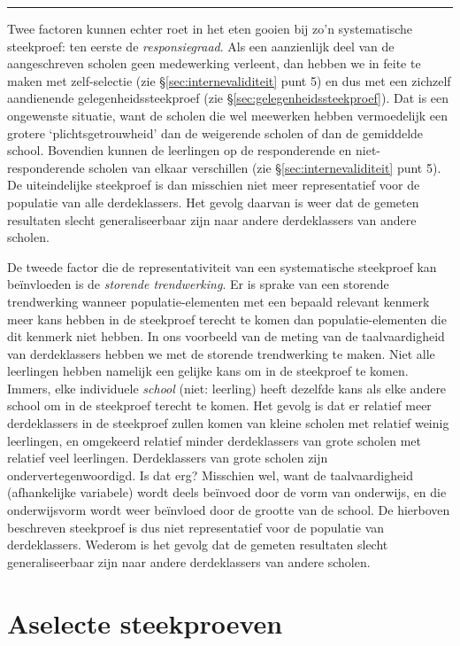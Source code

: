 \documentclass[
]{book}
\begin{document}
\begin{center}\rule{0.5\linewidth}{0.5pt}\end{center}

Twee factoren kunnen echter roet in het eten gooien bij zo'n
systematische steekproef: ten eerste de \emph{responsiegraad}. Als een
aanzienlijk deel van de aangeschreven scholen geen medewerking verleent,
dan hebben we in feite te maken met zelf-selectie (zie
§\ref{sec:internevaliditeit} punt 5)
en dus met een zichzelf aandienende
gelegenheidssteekproef (zie
§\ref{sec:gelegenheidssteekproef}). Dat is een ongewenste
situatie, want de scholen die wel meewerken hebben vermoedelijk een
grotere `plichtsgetrouwheid' dan de weigerende scholen of dan de
gemiddelde school. Bovendien kunnen de leerlingen op de responderende en
niet-responderende scholen van elkaar verschillen
(zie §\ref{sec:internevaliditeit} punt 5).
De uiteindelijke steekproef is dan
misschien niet meer representatief voor de populatie van alle
derdeklassers. Het gevolg daarvan is weer dat de gemeten resultaten
slecht generaliseerbaar zijn naar andere derdeklassers van andere
scholen.

De tweede factor die de representativiteit van een systematische
steekproef kan beïnvloeden is de \emph{storende trendwerking}. Er is sprake
van een storende trendwerking wanneer populatie-elementen met een
bepaald relevant kenmerk meer kans hebben in de steekproef terecht te
komen dan populatie-elementen die dit kenmerk niet hebben. In ons
voorbeeld van de meting van de taalvaardigheid van derdeklassers hebben
we met de storende trendwerking te maken. Niet alle leerlingen hebben
namelijk een gelijke kans om in de steekproef te komen. Immers, elke
individuele \emph{school} (niet: leerling) heeft dezelfde kans als elke
andere school om in de steekproef terecht te komen. Het gevolg is dat er
relatief meer derdeklassers in de steekproef zullen komen van kleine
scholen met relatief weinig leerlingen, en omgekeerd relatief minder
derdeklassers van grote scholen met relatief veel leerlingen.
Derdeklassers van grote scholen zijn ondervertegenwoordigd. Is dat erg?
Misschien wel, want de taalvaardigheid (afhankelijke variabele) wordt
deels beïnvoed door de vorm van onderwijs, en die onderwijsvorm wordt
weer beïnvloed door de grootte van de school. De hierboven beschreven
steekproef is dus niet representatief voor de populatie van
derdeklassers. Wederom is het gevolg dat de gemeten resultaten slecht
generaliseerbaar zijn naar andere derdeklassers van andere scholen.

\section{Aselecte steekproeven}\label{sec:aselectesteekproef}
\end{document}
